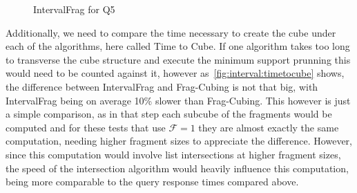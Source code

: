\begin{figure}[H]
  \caption{IntervalFrag for Q5}\label{fig:interval:q5}
  \vspace{6mm}
  \begin{center}
  \end{center}
  \vspace{2mm}
\end{figure}

Additionally, we need to compare the time necessary to create the cube under each of the algorithms, here called Time to Cube.
If one algorithm takes too long to transverse the cube structure and execute the minimum support prunning this would need to be counted against it, however as~\autoref{fig:interval:timetocube} shows, the difference between IntervalFrag and Frag-Cubing is not that big, with IntervalFrag being on average 10\% slower than Frag-Cubing.
This however is just a simple comparison, as in that step each subcube of the fragments would be computed and for these tests that use $\mathcal{F} = 1$ they are almost exactly the same computation, needing higher fragment sizes to appreciate the difference.
However, since this computation would involve list intersections at higher fragment sizes, the speed of the intersection algorithm would heavily influence this computation, being more comparable to the query response times compared above.

